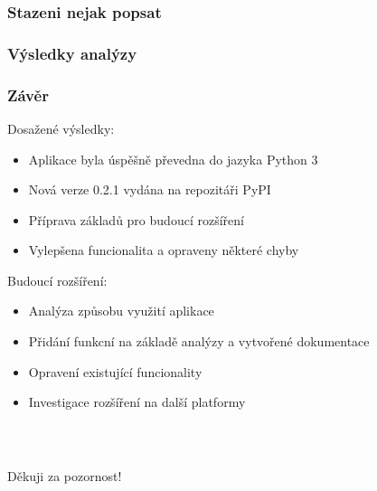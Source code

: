 \documentclass[%
  12pt,       				%
	t,                  %
	aspectratio=1610,   %
	unicode,						%
]{beamer}				    	%
\begin{document}
\begin{frame} 
\frametitle{Stazeni nejak popsat}
\end{frame}


\begin{frame} 
\frametitle{Výsledky analýzy}
\end{frame}

\begin{frame} 
	\frametitle{Závěr}
	Dosažené výsledky:
	\begin{itemize}
		\item Aplikace byla úspěšně převedna do jazyka Python 3
		\item Nová verze 0.2.1 vydána na repozitáři PyPI
		\item Příprava základů pro budoucí rozšíření
		\item Vylepšena funcionalita a opraveny některé chyby
	\end{itemize}
	Budoucí rozšíření:
	\begin{itemize}
		\item Analýza způsobu využití aplikace
		\item Přidání funkcní na základě analýzy a vytvořené dokumentace
		\item Opravení existující funcionality
		\item Investigace rozšíření na další platformy
	\end{itemize}
\end{frame}


\begin{frame}[c] 
	\frametitle{\mbox{ }}
	\begin{center}
		{\Huge Děkuji za pozornost!}
	\end{center}
\end{frame}

\end{document}
